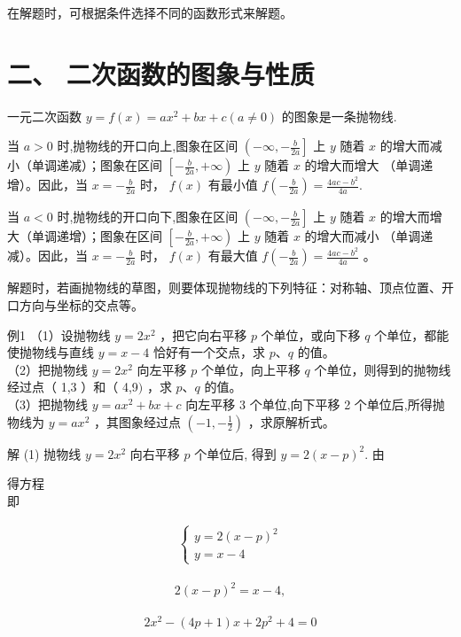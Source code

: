 \documentclass[10pt]{article}
\begin{document}
在解题时，可根据条件选择不同的函数形式来解题。

\section*{二、 二次函数的图象与性质}
一元二次函数 $y=f(x)=a x^{2}+b x+c(a \neq 0)$ 的图象是一条抛物线.

当 $a>0$ 时,抛物线的开口向上,图象在区间 $\left(-\infty,-\frac{b}{2 a}\right]$ 上 $y$ 随着 $x$ 的增大而减小（单调递减）；图象在区间 $\left[-\frac{b}{2 a},+\infty\right)$ 上 $y$ 随着 $x$ 的增大而增大 （单调递增）。因此，当 $x=-\frac{b}{2 a}$ 时， $f(x)$ 有最小值 $f\left(-\frac{b}{2 a}\right)=\frac{4 a c-b^{2}}{4 a}$.

当 $a<0$ 时,抛物线的开口向下,图象在区间 $\left(-\infty,-\frac{b}{2 a}\right]$ 上 $y$ 随着 $x$ 的增大而增大（单调递增）；图象在区间 $\left[-\frac{b}{2 a},+\infty\right)$ 上 $y$ 随着 $x$ 的增大而减小 （单调递减）。因此，当 $x=-\frac{b}{2 a}$ 时， $f(x)$ 有最大值 $f\left(-\frac{b}{2 a}\right)=\frac{4 a c-b^{2}}{4 a}$ 。

解题时，若画抛物线的草图，则要体现抛物线的下列特征：对称轴、顶点位置、开口方向与坐标的交点等。

例1 （1）设抛物线 $y=2 x^{2}$ ，把它向右平移 $p$ 个单位，或向下移 $q$ 个单位，都能使抛物线与直线 $y=x-4$ 恰好有一个交点，求 $p 、 q$ 的值。\\
（2）把抛物线 $y=2 x^{2}$ 向左平移 $p$ 个单位，向上平移 $q$ 个单位，则得到的抛物线经过点（ 1,3 ）和（ 4,9$)$ ，求 $p 、 q$ 的值。\\
（3）把抛物线 $y=a x^{2}+b x+c$ 向左平移 3 个单位,向下平移 2 个单位后,所得抛物线为 $y=a x^{2}$ ，其图象经过点 $\left(-1,-\frac{1}{2}\right)$ ，求原解析式。

解 (1) 抛物线 $y=2 x^{2}$ 向右平移 $p$ 个单位后, 得到 $y=2(x-p)^{2}$. 由

得方程\\
即

\begin{align*}
\left\{\begin{array}{l}
y=2(x-p)^{2} \\
y=x-4
\end{array}\right.
\end{align*}

\begin{align*}
2(x-p)^{2}=x-4,
\end{align*}

\begin{align*}
2 x^{2}-(4 p+1) x+2 p^{2}+4=0
\end{align*}
\end{document}
